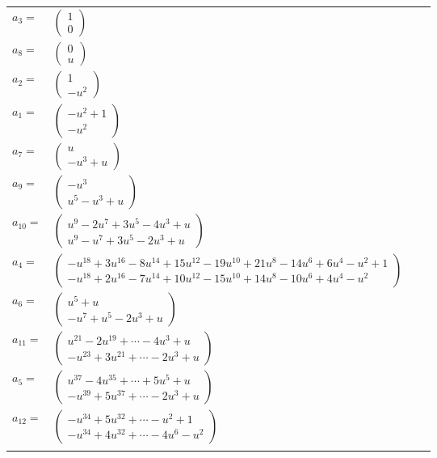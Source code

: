 \documentclass[1p]{elsarticle_modified}
\theoremstyle{definition}
\begin{document}
\begin{tabular}{m{7pt} m{180pt} m{7pt} m{180pt} }
\flushright $a_{3}=$&$\begin{pmatrix}1\\0\end{pmatrix}$ \\
\flushright $a_{8}=$&$\begin{pmatrix}0\\u\end{pmatrix}$ \\
\flushright $a_{2}=$&$\begin{pmatrix}1\\- u^2\end{pmatrix}$ \\
\flushright $a_{1}=$&$\begin{pmatrix}- u^2+1\\- u^2\end{pmatrix}$ \\
\flushright $a_{7}=$&$\begin{pmatrix}u\\- u^3+u\end{pmatrix}$ \\
\flushright $a_{9}=$&$\begin{pmatrix}- u^3\\u^5- u^3+u\end{pmatrix}$ \\
\flushright $a_{10}=$&$\begin{pmatrix}u^9-2 u^7+3 u^5-4 u^3+u\\u^9- u^7+3 u^5-2 u^3+u\end{pmatrix}$ \\
\flushright $a_{4}=$&$\begin{pmatrix}- u^{18}+3 u^{16}-8 u^{14}+15 u^{12}-19 u^{10}+21 u^8-14 u^6+6 u^4- u^2+1\\- u^{18}+2 u^{16}-7 u^{14}+10 u^{12}-15 u^{10}+14 u^8-10 u^6+4 u^4- u^2\end{pmatrix}$ \\
\flushright $a_{6}=$&$\begin{pmatrix}u^5+u\\- u^7+u^5-2 u^3+u\end{pmatrix}$ \\
\flushright $a_{11}=$&$\begin{pmatrix}u^{21}-2 u^{19}+\cdots-4 u^3+u\\- u^{23}+3 u^{21}+\cdots-2 u^3+u\end{pmatrix}$ \\
\flushright $a_{5}=$&$\begin{pmatrix}u^{37}-4 u^{35}+\cdots+5 u^5+u\\- u^{39}+5 u^{37}+\cdots-2 u^3+u\end{pmatrix}$ \\
\flushright $a_{12}=$&$\begin{pmatrix}- u^{34}+5 u^{32}+\cdots- u^2+1\\- u^{34}+4 u^{32}+\cdots-4 u^6- u^2\end{pmatrix}$\\&\end{tabular}
\end{document}
